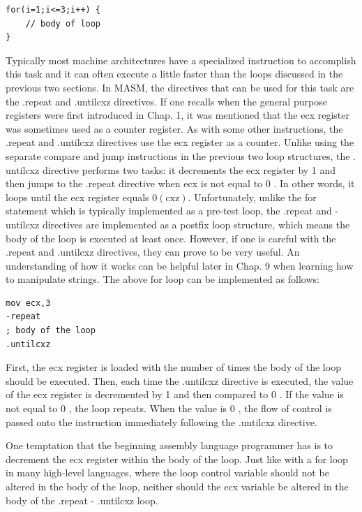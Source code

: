 \documentclass[10pt]{article}
\begin{document}
\begin{verbatim}
for(i=1;i<=3;i++) {
    // body of loop
}
\end{verbatim}

Typically most machine architectures have a specialized instruction to accomplish this task and it can often execute a little faster than the loops discussed in the previous two sections. In MASM, the directives that can be used for this task are the .repeat and .untilcxz directives. If one recalls when the general purpose registers were first introduced in Chap. 1, it was mentioned that the ecx register was sometimes used as a counter register. As with some other instructions, the .repeat and .untilcxz directives use the ecx register as a counter. Unlike using the separate compare and jump instructions in the previous two loop structures, the . untilcxz directive performs two tasks: it decrements the ecx register by 1 and then jumps to the .repeat directive when ecx is not equal to 0 . In other words, it loops until the ecx register equals $0(\mathrm{cxz})$. Unfortunately, unlike the for statement which is typically implemented as a pre-test loop, the .repeat and -untilcxz directives are implemented as a postfix loop structure, which means the body of the loop is executed at least once. However, if one is careful with the .repeat and .untilcxz directives, they can prove to be very useful. An understanding of how it works can be helpful later in Chap. 9 when learning how to manipulate strings. The above for loop can be implemented as follows:

\begin{verbatim}
mov ecx,3
-repeat
; body of the loop
.untilcxz
\end{verbatim}

First, the ecx register is loaded with the number of times the body of the loop should be executed. Then, each time the .untilcxz directive is executed, the value of the ecx register is decremented by 1 and then compared to 0 . If the value is not equal to 0 , the loop repeats. When the value is 0 , the flow of control is passed onto the instruction immediately following the .untilcxz directive.

One temptation that the beginning assembly language programmer has is to decrement the ecx register within the body of the loop. Just like with a for loop in many high-level languages, where the loop control variable should not be altered in the body of the loop, neither should the ecx variable be altered in the body of the .repeat - .untilcxz loop.
\end{document}
